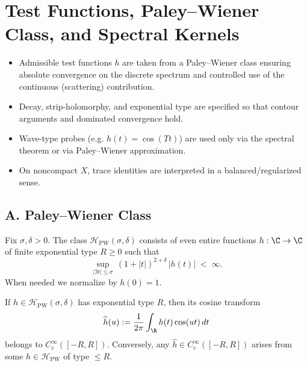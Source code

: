 \section{Test Functions, Paley–Wiener Class, and Spectral Kernels}
\label{sec:test-func-transforms}

\begin{tcolorbox}[colback=gray!5,colframe=gray!55,
  title=Scope and Assumptions (Part 2/5)]
\begin{itemize}
  \item Admissible test functions $h$ are taken from a Paley–Wiener class ensuring absolute convergence on the discrete spectrum and controlled use of the continuous (scattering) contribution.
  \item Decay, strip-holomorphy, and exponential type are specified so that contour arguments and dominated convergence hold.
  \item Wave-type probes (e.g. $h(t)=\cos(Tt)$) are used only via the spectral theorem or via Paley–Wiener approximation.
  \item On noncompact $X$, trace identities are interpreted in a balanced/regularized sense.
\end{itemize}
\end{tcolorbox}

\subsection*{A. Paley–Wiener Class}
\label{subsec:pw-class}

\begin{definition}
\label{def:pw-class}
Fix $\sigma,\delta>0$. The class $\mathcal H_{\mathrm{PW}}(\sigma,\delta)$ consists of even entire functions $h:\C\to\C$ of finite exponential type $R\ge0$ such that
\begin{equation}\label{eq:PW-decay}
  \sup_{|\Im t|\le \sigma}\, (1+|t|)^{2+\delta}\,|h(t)| \;<\;\infty.
\end{equation}
When needed we normalize by $h(0)=1$.
\end{definition}

\begin{remark}
If $h\in\mathcal H_{\mathrm{PW}}(\sigma,\delta)$ has exponential type $R$, then its cosine transform
\[
  \widehat h(u):=\frac{1}{2\pi}\int_{\R} h(t)\cos(ut)\,dt
\]
belongs to $C_c^\infty([-R,R])$. Conversely, any $\widehat h\in C_c^\infty([-R,R])$ arises from some $h\in \mathcal H_{\mathrm{PW}}$ of type $\le R$.
\end{remark}

